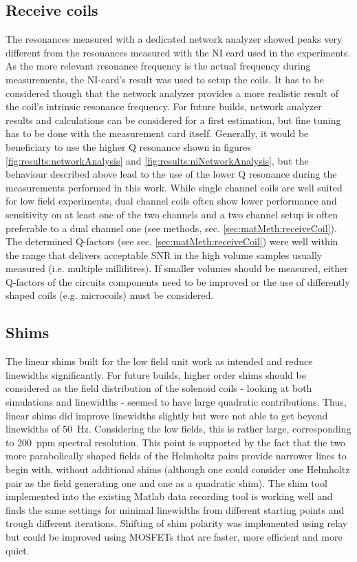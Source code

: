        \subsection{Receive coils}
            The resonances measured with a dedicated network analyzer showed peaks very different from the resonances measured with the NI card used in the experiments. As the more relevant resonance frequency is the actual frequency during measurements, the NI-card's result was used to setup the coils. It has to be considered though that the network analyzer provides a more realistic result of the coil's intrinsic resonance frequency. For future builds, network analyzer results and calculations can be considered for a first estimation, but fine tuning has to be done with the measurement card itself. Generally, it would be beneficiary to use the higher Q resonance shown in figures \ref{fig:results:networkAnalysis} and \ref{fig:results:niNetworkAnalysis}, but the behaviour described above lead to the use of the lower Q resonance during the measurements performed in this work.
            While single channel coils are well suited for low field experiments, dual channel coils often show lower performance and sensitivity on at least one of the two channels and a two channel setup is often preferable to a dual channel one (see methods, sec. \ref{sec:matMeth:receiveCoil}). The determined Q-factors (see sec. \ref{sec:matMeth:receiveCoil}) were well within the range that delivers acceptable SNR in the high volume samples usually measured (i.e. multiple millilitres). If smaller volumes should be measured, either Q-factors of the circuits components need to be improved or the use of differently shaped coils (e.g. microcoils) must be considered.
        \subsection{Shims}
            The linear shims built for the low field unit work as intended and reduce linewidths significantly. For future builds, higher order shims should be considered as the field distribution of the solenoid coils - looking at both simulations and linewidths - seemed to have large quadratic contributions. Thus, linear shims did improve linewidths slightly but were not able to get beyond linewidths of \SI{50}{\hertz}. Considering the low fields, this is rather large, corresponding to 200~ppm spectral resolution. This point is supported by the fact that the two more parabolically shaped fields of the Helmholtz pairs provide narrower lines to begin with, without additional shims (although one could consider one Helmholtz pair as the field generating one and one as a quadratic shim). The shim tool implemented into the existing Matlab data recording tool is working well and finds the same settings for minimal linewidths from different starting points and trough different iterations. Shifting of shim polarity was implemented using relay but could be improved using MOSFETs that are faster, more efficient and more quiet.

